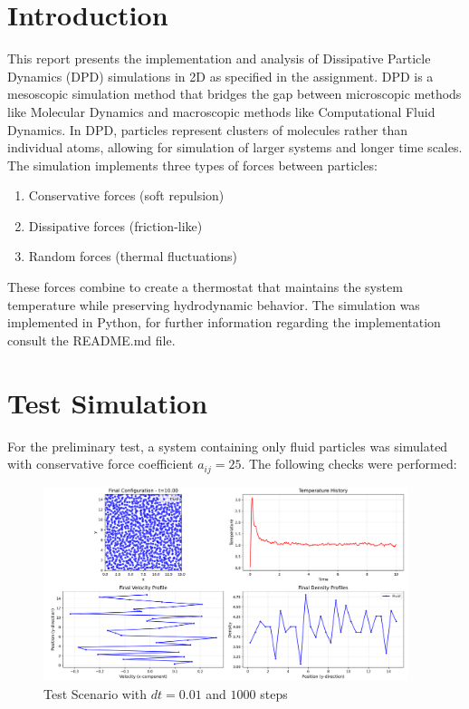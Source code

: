 \section*{Introduction}
This report presents the implementation and analysis of Dissipative Particle Dynamics (DPD) simulations in 2D as specified in the assignment. DPD is a mesoscopic simulation method that bridges the gap between microscopic methods like Molecular Dynamics and macroscopic methods like Computational Fluid Dynamics. In DPD, particles represent clusters of molecules rather than individual atoms, allowing for simulation of larger systems and longer time scales.
The simulation implements three types of forces between particles:
\begin{enumerate}
	\item Conservative forces (soft repulsion)
	\item Dissipative forces (friction-like)
	\item Random forces (thermal fluctuations)
\end{enumerate}
These forces combine to create a thermostat that maintains the system temperature while preserving hydrodynamic behavior.\newline
\newline
The simulation was implemented in Python, for further information regarding the implementation consult the README.md file.
\section{Test Simulation}
For the preliminary test, a system containing only fluid particles was simulated with conservative force coefficient $a_{ij} = 25$. The following checks were performed:
\begin{figure}[H]
	\begin{center}
		\includegraphics[width=0.95\textwidth]{figures/test_final_vis.png}
	\end{center}
	\caption{Test Scenario with $dt = 0.01$ and $1000$ steps}\label{fig:test}
\end{figure}

